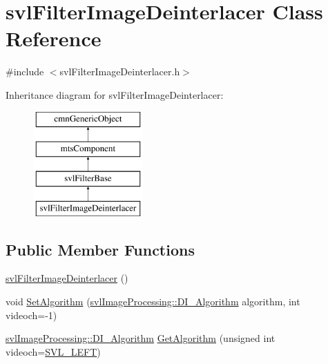 \hypertarget{classsvl_filter_image_deinterlacer}{}\section{svl\+Filter\+Image\+Deinterlacer Class Reference}
\label{classsvl_filter_image_deinterlacer}


{\ttfamily \#include $<$svl\+Filter\+Image\+Deinterlacer.\+h$>$}

Inheritance diagram for svl\+Filter\+Image\+Deinterlacer\+:\begin{figure}[H]
\begin{center}
\leavevmode
\includegraphics[height=4.000000cm]{da/d60/classsvl_filter_image_deinterlacer}
\end{center}
\end{figure}
\subsection*{Public Member Functions}
\begin{DoxyCompactItemize}
\item 
\hyperlink{classsvl_filter_image_deinterlacer_aef692af75f210e6fa06810aede1854d7}{svl\+Filter\+Image\+Deinterlacer} ()
\item 
void \hyperlink{classsvl_filter_image_deinterlacer_a9cbbfe94226c2bfe09d5b69d827d6d23}{Set\+Algorithm} (\hyperlink{namespacesvl_image_processing_a52b75591f8aa2cf8a2b4ea843b2f864a}{svl\+Image\+Processing\+::\+D\+I\+\_\+\+Algorithm} algorithm, int videoch=-\/1)
\item 
\hyperlink{namespacesvl_image_processing_a52b75591f8aa2cf8a2b4ea843b2f864a}{svl\+Image\+Processing\+::\+D\+I\+\_\+\+Algorithm} \hyperlink{classsvl_filter_image_deinterlacer_a850fb4dc6fbeee2708f96c52fe8ccf60}{Get\+Algorithm} (unsigned int videoch=\hyperlink{svl_definitions_8h_ab9fec7615f19c8df2919eebcab0b187f}{S\+V\+L\+\_\+\+L\+E\+F\+T})
\end{DoxyCompactItemize}
